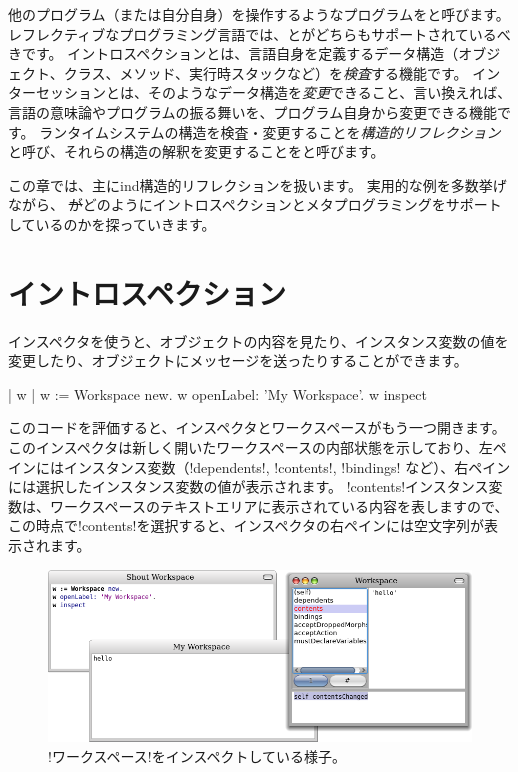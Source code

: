 \documentclass[a4paper,10pt,twoside]{book}
\begin{document}
他のプログラム（または自分自身）を操作するようなプログラムをと呼びます。
レフレクティブなプログラミング言語では、とがどちらもサポートされているべきです。
イントロスペクションとは、言語自身を定義するデータ構造（オブジェクト、クラス、メソッド、実行時スタックなど）を\emph{検査}する機能です。
インターセッションとは、そのようなデータ構造を\emph{変更}できること、言い換えれば、言語の意味論やプログラムの振る舞いを、プログラム自身から変更できる機能です。
ランタイムシステムの構造を検査・変更することを\emph{構造的リフレクション}と呼び、それらの構造の解釈を変更することをと呼びます。

この章では、主にind{構造的リフレクション}を扱います。
実用的な例を多数挙げながら、 \st がどのようにイントロスペクションとメタプログラミングをサポートしているのかを探っていきます。

\section{イントロスペクション}

インスペクタを使うと、オブジェクトの内容を見たり、インスタンス変数の値を変更したり、オブジェクトにメッセージを送ったりすることができます。

\begin{code}{| w |}
w := Workspace new.
w openLabel: 'My Workspace'.
w inspect
\end{code}

このコードを評価すると、インスペクタとワークスペースがもう一つ開きます。
このインスペクタは新しく開いたワークスペースの内部状態を示しており、左ペインにはインスタンス変数（\ct!dependents!, \ct!contents!, \ct!bindings! など）、右ペインには選択したインスタンス変数の値が表示されます。
\ct!contents!インスタンス変数は、ワークスペースのテキストエリアに表示されている内容を表しますので、この時点で\ct!contents!を選択すると、インスペクタの右ペインには空文字列が表示されます。

\begin{figure}[ht]\centering
	\includegraphics[width=\linewidth]{workspaceInspector}
	\caption{\lct!ワークスペース!をインスペクトしている様子。}
\end{figure}
\end{document}
